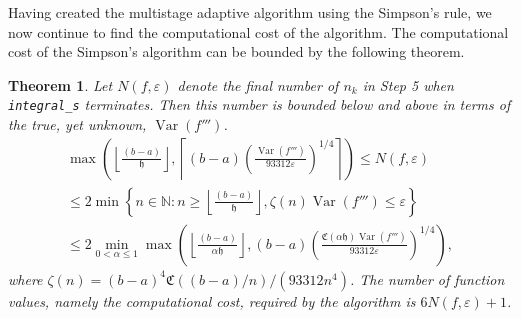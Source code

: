 \documentclass{iitthesis}
\DeclareMathOperator{\Var}{Var}
\newtheorem{theorem}{Theorem}
\theoremstyle{definition}
\theoremstyle{remark}
\begin{document}
Having created the multistage adaptive algorithm using the Simpson's rule, we now continue to find the computational cost of the algorithm. The computational cost of the Simpson's algorithm can be bounded by the following theorem.
\begin{theorem}\label{uppbndcostSimp}
    Let $N(f,\varepsilon)$ denote the final number of $n_k$ in Step 5 when {\tt integral\_s} terminates. Then this number is bounded below and above in terms of the true, yet unknown, $\Var(f''')$.
    \begin{multline}\label{uppbndcostineqsim}
        \max\left(\left\lfloor\frac{(b-a)}{\mathfrak{h}}\right\rfloor,\left\lceil(b-a)\left(\frac{\Var(f''')}{93312\varepsilon}\right)^{1/4}\right\rceil\right)\leq N(f,\varepsilon)\\ \leq 2\min\left\{n\in\mathbb{N}:n\geq\left\lfloor\frac{(b-a)}{\mathfrak{h}}\right\rfloor,\zeta(n)\Var(f''')\leq\varepsilon\right\}\\ \leq 2\min_{0<\alpha\leq1}\max\left(\left\lfloor\frac{(b-a)}{\alpha\mathfrak{h}}\right\rfloor,(b-a)\left(\frac{\mathfrak{C}(\alpha\mathfrak{h})\Var(f''')}{93312\varepsilon}\right)^{1/4}\right),
    \end{multline}
    where $\zeta(n)=(b-a)^4\mathfrak{C}((b-a)/n)/(93312n^4)$. The number of function values, namely the computational cost, required by the algorithm is $6N(f,\varepsilon)+1$.
\end{theorem}
\end{document}
